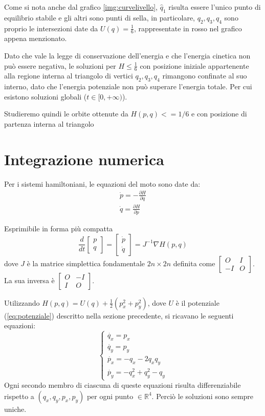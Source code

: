 \documentclass[a4paper]{article}
\numberwithin{equation}{section}
\numberwithin{figure}{section}
\begin{document}
Come si nota anche dal grafico \ref{img:curvelivello}, $\hat{q}_1$ risulta essere
l'unico punto di equilibrio stabile e gli altri sono punti di sella, in particolare,
$q_2, q_3, q_4$ sono proprio le intersezioni date da $U(q)=\frac{1}{6}$, rappresentate in rosso nel
grafico appena menzionato.

Dato che vale la legge di conservazione dell'energia e che l'energia cinetica non può essere negativa,
le soluzioni per $H \le \frac{1}{6}$ con posizione iniziale appartenente alla regione interna al triangolo
di vertici $q_2, q_3, q_4$ rimangono confinate al suo interno, dato che l'energia potenziale non può
superare l'energia totale. Per cui esistono soluzioni globali ($t \in [0, +\infty)$).

Studieremo quindi le orbite ottenute da $H(p,q)<=1/6$ e con posizione di partenza interna al triangolo

\section{Integrazione numerica}
Per i sistemi hamiltoniani, le equazioni del moto sono date da:
\begin{eqnarray}
	\dot{p} = -\frac{\partial H}{\partial q}\\
	\dot{q} = \frac{\partial H}{\partial p}
\end{eqnarray}

Esprimibile in forma più compatta
\begin{equation}
	\frac{d}{dt}
	\begin{bmatrix}
		p\\q
	\end{bmatrix} =
	\begin{bmatrix}
		\dot{p}\\\dot{q}
	\end{bmatrix} = 
	J^{-1}\nabla H(p,q)
\end{equation}
dove $J$ è la matrice simplettica fondamentale $2n\times 2n$ definita come $\begin{bmatrix}
O&I\\-I&O \end{bmatrix}$. La sua inversa è $\begin{bmatrix}
O&-I\\I&O \end{bmatrix}$.

Utilizzando $H(p,q) = U(q)+\frac{1}{2}(p_x^2+p_y^2)$, dove $U$ è il potenziale (\ref{eq:potenziale})
descritto nella sezione precedente, si ricavano le
seguenti equazioni:
$$
\begin{cases}
	\dot{q_x} = p_x\\
	\dot{q_y} = p_y\\
	\dot{p_x} = -q_x-2q_x q_y\\
	\dot{p_y} = -q_x^2 + q_y^2 - q_y
\end{cases}
$$
Ogni secondo membro di ciascuna di queste equazioni risulta differenziabile rispetto a
$(q_x,q_y,p_x,p_y)$ per ogni punto $\in \mathbb{R}^4$. Perciò le soluzioni sono sempre
uniche.
\end{document}
